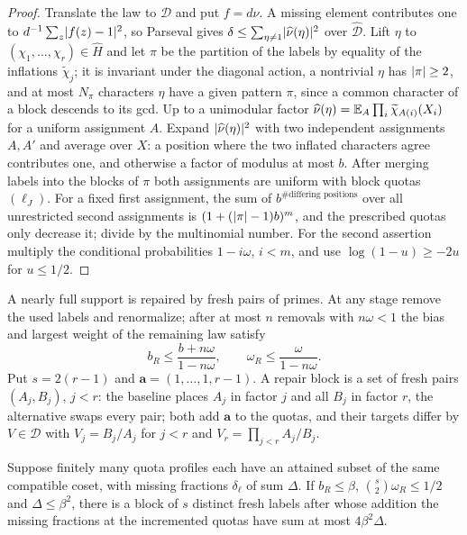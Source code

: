 \begin{proof}
Translate the law to $\mathcal D$ and put $f=d\nu$. A missing element contributes one to
$d^{-1}\sum_z\lvert f(z)-1\rvert^2$, so Parseval gives $\delta\le\sum_{\eta\ne1}\lvert\widehat\nu(\eta)\rvert^2$ over
$\widehat{\mathcal D}$. Lift $\eta$ to $(\chi_1,\dots,\chi_r)\in\widehat H$ and let $\pi$ be the partition of
the labels by equality of the inflations $\widetilde\chi_j$; it is invariant under the diagonal action, a
nontrivial $\eta$ has $\lvert\pi\rvert\ge2$, and at most $N_\pi$ characters $\eta$ have a given pattern $\pi$,
since a common character of a block descends to its gcd. Up to a unimodular factor
$\widehat\nu(\eta)=\mathbb{E}_A\prod_i\widetilde\chi_{A(i)}(X_i)$ for a uniform assignment $A$. Expand
$\lvert\widehat\nu(\eta)\rvert^2$ with two independent assignments $A,A'$ and average over $X$: a position where
the two inflated characters agree contributes one, and otherwise a factor of modulus at most $b$. After
merging labels into the blocks of $\pi$ both assignments are uniform with block quotas $(\ell_J)$. For a
fixed first assignment, the sum of $b^{\#\text{differing positions}}$ over all unrestricted second
assignments is $(1+(\lvert\pi\rvert-1)b)^m$, and the prescribed quotas only decrease it; divide by the multinomial
number. For the second assertion multiply the conditional probabilities $1-i\omega$, $i<m$, and use
$\log(1-u)\ge-2u$ for $u\le1/2$.
\end{proof}

A nearly full support is repaired by fresh pairs of primes. At any stage remove the used labels and
renormalize; after at most $n$ removals with $n\omega<1$ the bias and largest weight of the remaining law
satisfy
\begin{equation}\label{dir:eq:residual}
 b_R\le\frac{b+n\omega}{1-n\omega},\qquad\omega_R\le\frac{\omega}{1-n\omega}.
\end{equation}
Put $s=2(r-1)$ and $\mathbf a=(1,\dots,1,r-1)$. A repair block is a set of fresh pairs $(A_j,B_j)$,
$j<r$: the baseline places $A_j$ in factor $j$ and all $B_j$ in factor $r$, the alternative swaps every
pair; both add $\mathbf a$ to the quotas, and their targets differ by $V\in\mathcal D$ with
$V_j=B_j/A_j$ for $j<r$ and $V_r=\prod_{j<r}A_j/B_j$.

\begin{lemma}\label{dir:lem:pairrepair}
Suppose finitely many quota profiles each have an attained subset of the same compatible coset, with
missing fractions $\delta_\ell$ of sum $\Delta$. If $b_R\le\beta$, $\binom s2\omega_R\le1/2$ and
$\Delta\le\beta^2$, there is a block of $s$ distinct fresh labels after whose addition the missing fractions at
the incremented quotas have sum at most $4\beta^2\Delta$.
\end{lemma}


